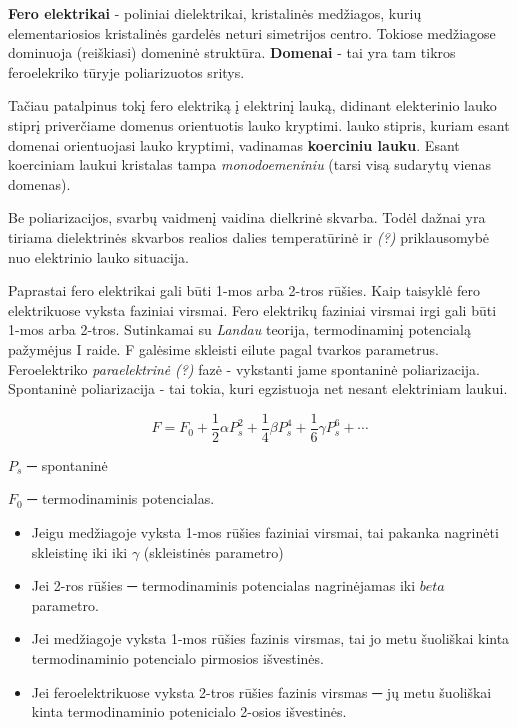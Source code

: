 \textbf{Fero elektrikai} - poliniai dielektrikai,
kristalinės medžiagos, kurių elementariosios kristalinės gardelės neturi simetrijos centro.
Tokiose medžiagose dominuoja (reiškiasi) domeninė struktūra.
\textbf{Domenai} - tai yra tam tikros feroelekriko tūryje poliarizuotos sritys.

Tačiau patalpinus tokį fero elektriką į elektrinį lauką,
didinant elekterinio lauko stiprį priverčiame domenus orientuotis lauko kryptimi.
lauko stipris, kuriam esant domenai orientuojasi lauko kryptimi,
vadinamas \textbf{koerciniu lauku}.
Esant koerciniam laukui kristalas tampa \textit{monodoemeniniu} (tarsi visą sudarytų vienas domenas).

Be poliarizacijos, svarbų vaidmenį vaidina dielkrinė skvarba.
Todėl dažnai yra tiriama dielektrinės skvarbos realios dalies temperatūrinė ir \textit{(?)} priklausomybė nuo elektrinio lauko situacija.

Paprastai fero elektrikai gali būti 1-mos arba 2-tros rūšies.
Kaip taisyklė fero elektrikuose vyksta faziniai virsmai.
Fero elektrikų faziniai virsmai irgi gali būti 1-mos arba 2-tros.
Sutinkamai su \textit{Landau} teorija, termodinaminį potencialą pažymėjus
I raide. F galėsime skleisti eilute pagal tvarkos parametrus.
Feroelektriko \textit{paraelektrinė} \textit{(?)} fazė - vykstanti jame spontaninė poliarizacija.
Spontaninė poliarizacija - tai tokia, kuri egzistuoja net nesant elektriniam
laukui.

\begin{equation*}
  F = F_0 + \frac{1}{2}\alpha P_s^2 +
  \frac{1}{4}\beta P_s^4 + \frac{1}{6}\gamma P_s^6 + \cdots
\end{equation*}

$P_s$ ─ spontaninė

$F_0$ ─ termodinaminis potencialas.

\begin{itemize}
  \item Jeigu medžiagoje vyksta 1-mos rūšies faziniai virsmai,
  tai pakanka nagrinėti skleistinę iki iki $\gamma$ (skleistinės parametro)
  \item Jei 2-ros rūšies ─ termodinaminis potencialas nagrinėjamas iki $beta$
  parametro.
\end{itemize}

\begin{itemize}
  \item Jei medžiagoje vyksta 1-mos rūšies fazinis virsmas,
  tai jo metu šuoliškai kinta termodinaminio potencialo pirmosios išvestinės.
  \item Jei feroelektrikuose vyksta 2-tros rūšies fazinis virsmas
  ─ jų metu šuoliškai kinta termodinaminio potenicialo 2-osios išvestinės.
\end{itemize}

